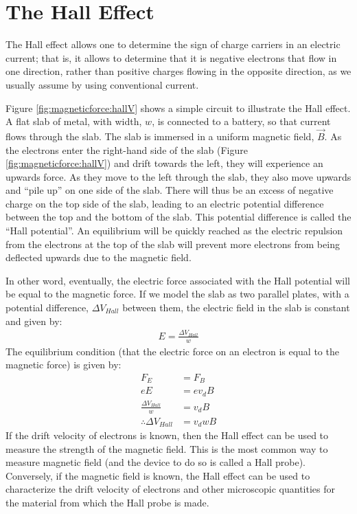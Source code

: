 \section{The Hall Effect}
The Hall effect allows one to determine the sign of charge carriers in an electric current; that is, it allows to determine that it is negative electrons that flow in one direction, rather than positive charges flowing in the opposite direction, as we usually assume by using conventional current.

Figure \ref{fig:magneticforce:hallV} shows a simple circuit to illustrate the Hall effect. A flat slab of metal, with width, $w$, is connected to a battery, so that current flows through the slab. The slab is immersed in a uniform magnetic field, $\vec B$. 
As the electrons enter the right-hand side of the slab (Figure \ref{fig:magneticforce:hallV}) and drift towards the left, they will experience an upwards force. As they move to the left through the slab, they also move upwards and ``pile up'' on one side of the slab. There will thus be an excess of negative charge on the top side of the slab, leading to an electric potential difference between the top and the bottom of the slab. This potential difference is called the ``Hall potential''. An equilibrium will be quickly reached as the electric repulsion from the electrons at the top of the slab will prevent more electrons from being deflected upwards due to the magnetic field.

In other word, eventually, the electric force associated with the Hall potential will be equal to the magnetic force. If we model the slab as two parallel plates, with a potential difference, $\Delta V_{Hall}$ between them, the electric field in the slab is constant and given by:
\begin{align*}
E= \frac{\Delta V_{Hall}}{w}
\end{align*}
The equilibrium condition (that the electric force on an electron is equal to the magnetic force) is given by:
\begin{align*}
F_E &= F_B\\
eE &= ev_dB\\
\frac{\Delta V_{Hall}}{w} &= v_d B\\
\therefore \Delta V_{Hall}&= v_d wB
\end{align*}
If the drift velocity of electrons is known, then the Hall effect can be used to measure the strength of the magnetic field. This is the most common way to measure magnetic field (and the device to do so is called a Hall probe). Conversely, if the magnetic field is known, the Hall effect can be used to characterize the drift velocity of electrons and other microscopic quantities for the material from which the Hall probe is made.

